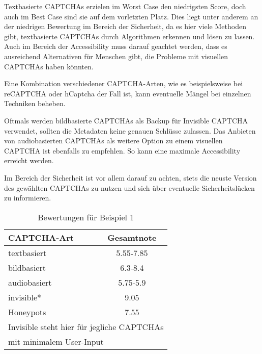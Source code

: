 Textbasierte CAPTCHAs erzielen im Worst Case den niedrigsten Score, doch auch im Best Case sind sie auf dem vorletzten Platz.
Dies liegt unter anderem an der niedrigen Bewertung im Bereich der Sicherheit, 
da es hier viele Methoden gibt, textbasierte CAPTCHAs durch Algorithmen erkennen und lösen zu lassen.
Auch im Bereich der Accessibility muss darauf geachtet werden, dass es ausreichend Alternativen für Menschen gibt,
die Probleme mit visuellen CAPTCHAs haben könnten.

Eine Kombination verschiedener CAPTCHA-Arten, wie es beispielsweise bei reCAPTCHA oder hCaptcha der Fall ist, 
kann eventuelle Mängel bei einzelnen Techniken beheben.

Oftmals werden bildbasierte CAPTCHAs als Backup für Invisible CAPTCHA verwendet, sollten die Metadaten keine genauen Schlüsse zulassen.
Das Anbieten von audiobasierten CAPTCHAs als weitere Option zu einem visuellen CAPTCHA ist ebenfalls zu empfehlen.
So kann eine maximale Accessibility erreicht werden.

Im Bereich der Sicherheit ist vor allem darauf zu achten, stets die neuste Version des gewählten CAPTCHAs zu nutzen 
und sich über eventuelle Sicherheitslücken zu informieren.

\begin{table}[h!]
    \caption{Bewertungen für Beispiel 1}
    \begin{center}
        \begin{tabular}{l|c}
            CAPTCHA-Art                       & Gesamtnote \\\hline
            textbasiert            &  5.55-7.85       \\
            bildbasiert                   &  6.3-8.4      \\
            audiobasiert        & 5.75-5.9         \\
            invisible*                      & 9.05         \\
            Honeypots       & 7.55\\
            \multicolumn{2}{l}{\footnotesize * Invisible steht hier für jegliche CAPTCHAs} \\
            \multicolumn{2}{l}{\footnotesize \space \space mit minimalem User-Input}
        \end{tabular}
    \end{center}
\end{table}

